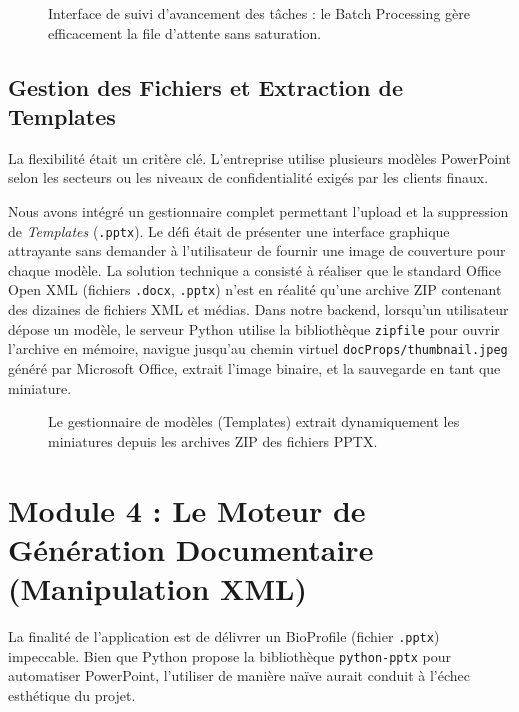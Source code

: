 \begin{figure}[H]
    \centering
    \vspace{7cm} %
    \caption{Interface de suivi d'avancement des tâches : le Batch Processing gère efficacement la file d'attente sans saturation.}
    \label{fig:batch_processing}
\end{figure}

\subsection{Gestion des Fichiers et Extraction de Templates}
La flexibilité était un critère clé. L'entreprise utilise plusieurs modèles PowerPoint selon les secteurs ou les niveaux de confidentialité exigés par les clients finaux.

Nous avons intégré un gestionnaire complet permettant l'upload et la suppression de \textit{Templates} (\texttt{.pptx}). Le défi était de présenter une interface graphique attrayante sans demander à l'utilisateur de fournir une image de couverture pour chaque modèle. 
La solution technique a consisté à réaliser que le standard Office Open XML (fichiers \texttt{.docx}, \texttt{.pptx}) n'est en réalité qu'une archive ZIP contenant des dizaines de fichiers XML et médias. Dans notre backend, lorsqu'un utilisateur dépose un modèle, le serveur Python utilise la bibliothèque \texttt{zipfile} pour ouvrir l'archive en mémoire, navigue jusqu'au chemin virtuel \texttt{docProps/thumbnail.jpeg} généré par Microsoft Office, extrait l'image binaire, et la sauvegarde en tant que miniature.

\begin{figure}[H]
    \centering
    \vspace{7cm} %
    \caption{Le gestionnaire de modèles (Templates) extrait dynamiquement les miniatures depuis les archives ZIP des fichiers PPTX.}
    \label{fig:template_gallery}
\end{figure}


\section{Module 4 : Le Moteur de Génération Documentaire (Manipulation XML)}

La finalité de l'application est de délivrer un BioProfile (fichier \texttt{.pptx}) impeccable. Bien que Python propose la bibliothèque \texttt{python-pptx} pour automatiser PowerPoint, l'utiliser de manière naïve aurait conduit à l'échec esthétique du projet.

